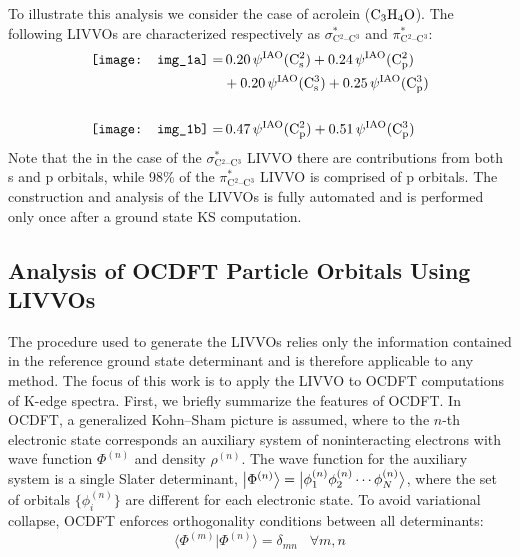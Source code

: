 \documentclass{article}
\begin{document}
To illustrate this analysis we consider the case of acrolein ($\rm C_3H_4O$).
The following LIVVOs are characterized respectively as $\sigma^*_\text{C$^2$--C$^3$}$ and $\pi^*_\text{C$^2$--C$^3$}$:
\begin{equation*}
\begin{split}
\vcenter{\hbox{\texttt{[image: img\_1a]}}} =& 
\, 0.20 \, \psi^{\rm IAO}(\rm C^2_s) + 0.24 \, \psi^{\rm IAO}(\rm C^2_p) \\
& + 0.20 \, \psi^{\rm IAO}(\rm C^3_s)  + 0.25 \, \psi^{\rm IAO}(\rm C^3_p) \\
\\
\vcenter{\hbox{\texttt{[image: img\_1b]}}} =& \,
 0.47 \, \psi^{\rm IAO}(\rm C^2_p)  + 0.51 \,  \psi^{\rm IAO}(\rm C^3_p)  
\end{split}
\end{equation*}
Note that the in the case of the $\sigma^*_\text{C$^2$--C$^3$}$ LIVVO there are contributions from both s and p orbitals, while 98\% of the $\pi^*_\text{C$^2$--C$^3$}$ LIVVO is comprised of p orbitals.
The construction and analysis of the LIVVOs is fully automated and is performed only once after a ground state KS computation.

\subsection{Analysis of OCDFT Particle Orbitals Using LIVVOs}
The procedure used to generate the LIVVOs relies only the information contained in the reference ground state determinant and is therefore applicable to any method.
The focus of this work is to apply the LIVVO to OCDFT computations of K-edge spectra.
First, we briefly summarize the features of OCDFT.
In OCDFT,\cite{evangelista_orthogonality_2013} a generalized Kohn--Sham picture is assumed, where to the $n$-th electronic state corresponds an auxiliary system of noninteracting electrons with wave function $\Phi^{(n)}$ and density $\rho^{(n)}$. The wave function for the auxiliary system is a single Slater determinant, $\ket{\Phi^{(n)}} = \ket[1]{\phi_1^{(n)}\phi_2^{(n)} \cdots\phi_N^{(n)}}$, where the set of orbitals $\{\phi_i^{(n)}\}$ are different for each electronic state. To avoid variational collapse, OCDFT enforces orthogonality conditions between all determinants:
\begin{equation}
\label{eq:OCcondition}
\langle \Phi^{(m)} | \Phi^{(n)} \rangle = \delta_{mn} \;\;\;  \forall m,n
\end{equation}
\end{document}

